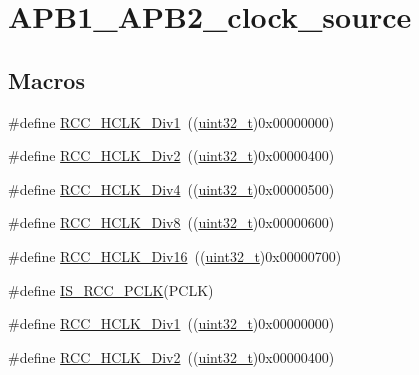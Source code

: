 \hypertarget{group___a_p_b1___a_p_b2__clock__source}{}\section{A\+P\+B1\+\_\+\+A\+P\+B2\+\_\+clock\+\_\+source}
\label{group___a_p_b1___a_p_b2__clock__source}
\subsection*{Macros}
\begin{DoxyCompactItemize}
\item 
\#define \hyperlink{group___a_p_b1___a_p_b2__clock__source_gae62b4a39ae69cc221f2ab7d4518bfb76}{R\+C\+C\+\_\+\+H\+C\+L\+K\+\_\+\+Div1}~((\hyperlink{_p_e___types_8h_a33594304e786b158f3fb30289278f5af}{uint32\+\_\+t})0x00000000)
\item 
\#define \hyperlink{group___a_p_b1___a_p_b2__clock__source_ga177bb3648def9a961c16f93f15ca0f62}{R\+C\+C\+\_\+\+H\+C\+L\+K\+\_\+\+Div2}~((\hyperlink{_p_e___types_8h_a33594304e786b158f3fb30289278f5af}{uint32\+\_\+t})0x00000400)
\item 
\#define \hyperlink{group___a_p_b1___a_p_b2__clock__source_gafd8cf0e32a3ea5648cdc054766bc2017}{R\+C\+C\+\_\+\+H\+C\+L\+K\+\_\+\+Div4}~((\hyperlink{_p_e___types_8h_a33594304e786b158f3fb30289278f5af}{uint32\+\_\+t})0x00000500)
\item 
\#define \hyperlink{group___a_p_b1___a_p_b2__clock__source_gab2e2b6e0b8fe22d6638b672918b22097}{R\+C\+C\+\_\+\+H\+C\+L\+K\+\_\+\+Div8}~((\hyperlink{_p_e___types_8h_a33594304e786b158f3fb30289278f5af}{uint32\+\_\+t})0x00000600)
\item 
\#define \hyperlink{group___a_p_b1___a_p_b2__clock__source_ga6353aaa0b302fdd5d946fd21756e2273}{R\+C\+C\+\_\+\+H\+C\+L\+K\+\_\+\+Div16}~((\hyperlink{_p_e___types_8h_a33594304e786b158f3fb30289278f5af}{uint32\+\_\+t})0x00000700)
\item 
\#define \hyperlink{group___a_p_b1___a_p_b2__clock__source_gab70f1257ea47c1da4def8e351af4d9f2}{I\+S\+\_\+\+R\+C\+C\+\_\+\+P\+C\+LK}(P\+C\+LK)
\item 
\#define \hyperlink{group___a_p_b1___a_p_b2__clock__source_gae62b4a39ae69cc221f2ab7d4518bfb76}{R\+C\+C\+\_\+\+H\+C\+L\+K\+\_\+\+Div1}~((\hyperlink{_p_e___types_8h_a33594304e786b158f3fb30289278f5af}{uint32\+\_\+t})0x00000000)
\item 
\#define \hyperlink{group___a_p_b1___a_p_b2__clock__source_ga177bb3648def9a961c16f93f15ca0f62}{R\+C\+C\+\_\+\+H\+C\+L\+K\+\_\+\+Div2}~((\hyperlink{_p_e___types_8h_a33594304e786b158f3fb30289278f5af}{uint32\+\_\+t})0x00000400)

\end{DoxyCompactItemize}
